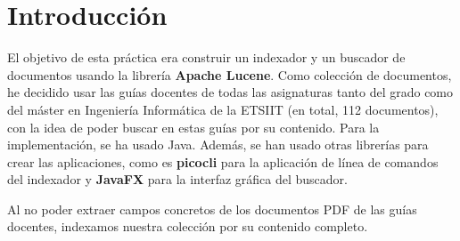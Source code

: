 \section{Introducción}

El objetivo de esta práctica era construir un indexador y un buscador de documentos usando la librería \textbf{Apache Lucene}. Como colección de documentos, he decidido usar las guías docentes de todas las asignaturas tanto del grado como del máster en Ingeniería Informática de la ETSIIT (en total, 112 documentos), con la idea de poder buscar en estas guías por su contenido. Para la implementación, se ha usado Java. Además, se han usado otras librerías para crear las aplicaciones, como es \textbf{picocli} para la aplicación de línea de comandos del indexador y \textbf{JavaFX} para la interfaz gráfica del buscador.

Al no poder extraer campos concretos de los documentos PDF de las guías docentes, indexamos nuestra colección por su contenido completo.